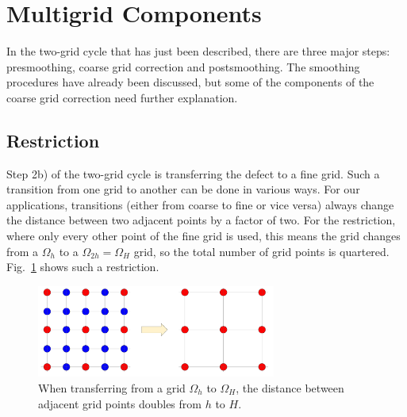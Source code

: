 \section{Multigrid Components}
In the two-grid cycle that has just been described, there are three major steps: presmoothing, coarse grid correction and postsmoothing. The smoothing procedures have already been discussed, but some of the components of the coarse grid correction need further explanation. 

\subsection{Restriction}
Step 2b) of the two-grid cycle is transferring the defect to a fine grid. Such a transition from one grid to another can be done in various ways. For our applications, transitions (either from coarse to fine or vice versa) always change the distance between two adjacent points by a factor of two. For the restriction, where only every other point of the fine grid is used, this means the grid changes from a $\Omega_{h}$ to a $\Omega_{2h} = \Omega_H$ grid, so the total number of grid points is quartered. Fig.~\ref{fig:mg_restriction} shows such a restriction. 

\begin{figure}[h]
	\centering
	\includegraphics[width=0.7\textwidth]{chapters/chapter02/mg_restriktion}
	\caption{When transferring from a grid $\Omega_h$ to $\Omega_H$, the distance between adjacent grid points doubles from $h$ to $H$.}
	\label{fig:mg_restriction}
\end{figure}

